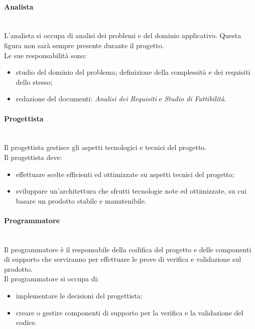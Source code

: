 			\paragraph{Analista} \mbox{}\\
			L'analista si occupa di analisi dei problemi e del dominio applicativo. Questa figura non sarà sempre presente durante il progetto. \\
			Le sue responsabilità sono:
			\begin{itemize}
				\item studio del dominio del problema; definizione della complessità  e dei requisiti dello stesso;
				\item redazione del documenti: \textit{Analisi dei Requisiti} e \textit{Studio di Fattibilità}.
			\end{itemize}
			\paragraph{Progettista} \mbox{}\\
			Il progettista gestisce gli aspetti tecnologici e tecnici del progetto.\\
			Il progettista deve:
			\begin{itemize}
				\item effettuare scelte efficienti ed ottimizzate su aspetti tecnici del progetto;
				\item sviluppare un'architettura che sfrutti tecnologie note ed ottimizzate, su cui basare un prodotto stabile e manutenibile.
			\end{itemize}
			\paragraph{Programmatore} \mbox{}\\
			Il programmatore è il responsabile della codifica del progetto e delle componenti di supporto che serviranno per effettuare le prove di verifica e validazione sul prodotto.\\
			Il programmatore si occupa di:
			\begin{itemize}
				\item implementare le decisioni del progettista;
				\item creare o gestire componenti di supporto per la verifica e la validazione del codice.
			\end{itemize}
